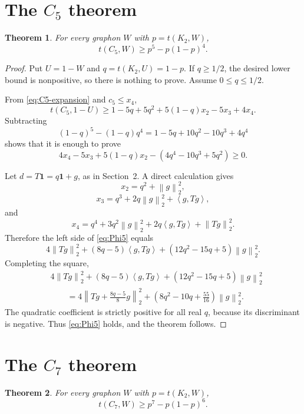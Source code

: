 \documentclass[11pt]{article}
\newtheorem{theorem}{Theorem}[section]
\newcommand{\one}{\mathbf 1}
\newcommand{\ip}[2]{\left\langle #1,#2\right\rangle}
\newcommand{\norm}[1]{\left\|#1\right\|}
\begin{document}
\section{The $C_5$ theorem}\label{sec:C5}

\begin{theorem}\label{thm:C5}
For every graphon $W$ with $p=t(K_2,W)$,
\[
        t(C_5,W)\ge p^5-p(1-p)^4.
\]
\end{theorem}

\begin{proof}
Put $U=1-W$ and $q=t(K_2,U)=1-p$.  If $q\ge1/2$, the desired lower bound is nonpositive, so there is nothing to prove.  Assume $0\le q\le1/2$.

From \eqref{eq:C5-expansion} and $c_5\le x_4$,
\[
        t(C_5,1-U)
        \ge 1-5q+5q^2+5(1-q)x_2-5x_3+4x_4.
\]
Subtracting
\[
        (1-q)^5-(1-q)q^4
        =1-5q+10q^2-10q^3+4q^4
\]
shows that it is enough to prove
\begin{equation}\label{eq:Phi5}
        4x_4-5x_3+5(1-q)x_2-(4q^4-10q^3+5q^2)\ge0.
\end{equation}

Let $d=T\one=q\one+g$, as in Section~2.  A direct calculation gives
\[
        x_2=q^2+\norm{g}_2^2,
\]
\[
        x_3=q^3+2q\norm{g}_2^2+\ip{g}{Tg},
\]
and
\[
        x_4=q^4+3q^2\norm{g}_2^2+2q\ip{g}{Tg}+\norm{Tg}_2^2.
\]
Therefore the left side of \eqref{eq:Phi5} equals
\[
        4\norm{Tg}_2^2+(8q-5)\ip{g}{Tg}+(12q^2-15q+5)\norm{g}_2^2.
\]
Completing the square,
\[
\begin{aligned}
&4\norm{Tg}_2^2+(8q-5)\ip{g}{Tg}+(12q^2-15q+5)\norm{g}_2^2\\
&\qquad =4\left\|Tg+\frac{8q-5}{8}g\right\|_2^2
+\left(8q^2-10q+\frac{55}{16}\right)\norm{g}_2^2.
\end{aligned}
\]
The quadratic coefficient is strictly positive for all real $q$, because its discriminant is negative.  Thus \eqref{eq:Phi5} holds, and the theorem follows.
\end{proof}

\section{The $C_7$ theorem}\label{sec:C7}

\begin{theorem}\label{thm:C7}
For every graphon $W$ with $p=t(K_2,W)$,
\[
        t(C_7,W)\ge p^7-p(1-p)^6.
\]
\end{theorem}
\end{document}
